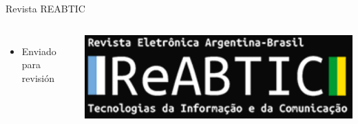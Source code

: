 \begin{frame}
\begin{block}{\small Revista REABTIC}
\begin{columns}
\begin{itemize}
                \item
                Enviado para revisión
            \end{itemize}

            \begin{center}
                \includegraphics[width=\textwidth]{images/logo-reabtic.png}
            \end{center}
        \end{columns}
    \end{block}
\end{frame}

